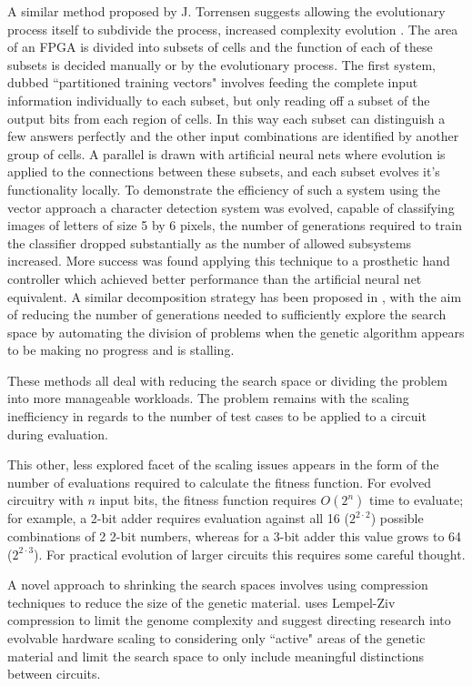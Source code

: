 A similar method proposed by J. Torrensen suggests allowing the evolutionary
process itself to subdivide the process, increased complexity evolution \cite{Torresen2002}. The area
of an FPGA is divided into subsets of cells and the function of each of these
subsets is decided manually or by the evolutionary process.
The first system, dubbed ``partitioned training vectors" involves feeding the
complete input information individually to each subset, but only reading off
a subset of the output bits from each region of cells. In this way each subset
can distinguish a few answers perfectly and the other input combinations are
identified by another group of cells.
A parallel is drawn
with artificial neural nets where evolution is applied to the connections between
these subsets, and each subset evolves it's functionality locally. To demonstrate
the efficiency of such a system using the vector approach a character detection system was evolved, capable
of classifying images of letters of size 5 by 6 pixels, the number of generations
required to train the classifier dropped substantially as the number of allowed subsystems
increased. More success was found applying this technique to a prosthetic hand controller
which achieved better performance than the artificial neural net equivalent.
A similar decomposition strategy has been proposed in \cite{1703646}, with the
aim of reducing the number of generations needed to sufficiently explore the search
space by automating the division of problems when the genetic algorithm appears to
be making no progress and is stalling.

These methods all deal with reducing the search space or dividing the problem into
more manageable workloads. The problem remains with the scaling inefficiency in
regards to the number of test cases to be applied to a circuit during evaluation.

This other, less explored facet of the scaling issues appears in the form of the number of
evaluations required to calculate the fitness function. For evolved circuitry
with $n$ input bits, the fitness function requires $O(2^{n})$ time to evaluate;
for example, a 2-bit adder requires evaluation against all 16 ($2^{2 \cdot 2}$) possible combinations
of 2 2-bit numbers, whereas for a 3-bit adder this value grows to 64 ($2^{2 \cdot 3}$).
For practical evolution of larger circuits this requires some careful thought.

A novel approach to shrinking the search spaces involves using compression
techniques to reduce the size of the genetic material. \cite{1508485} uses
Lempel-Ziv compression to limit the genome complexity and suggest directing
research into evolvable hardware scaling to considering only ``active" areas
of the genetic material and limit the search space to only include meaningful
distinctions between circuits.

